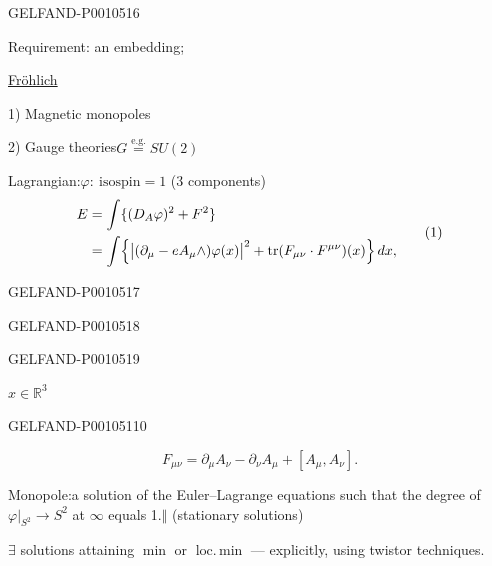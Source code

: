 \begin{GelfandAdjacentEvidence}{GELFAND-P001051}{6}


Requirement:\quad
{}
\quad an embedding;

\underline{Fröhlich}

1) Magnetic monopoles

2) Gauge theories\quad $G\overset{\text{e.g.}}{=}SU(2)$

Lagrangian:\quad $\varphi:\ \mathrm{isospin}=1$ \quad (3 components)
\begin{equation*}
\begin{aligned}
E
&=\int\{(D_A\varphi)^2+F^2\}\\
&=\int\Bigl\{
\bigl|(\partial_\mu-eA_\mu\wedge)\varphi(x)\bigr|^2
+\operatorname{tr}(F_{\mu\nu}\cdot F^{\mu\nu})(x)
\Bigr\}\,dx,
\end{aligned}
\tag{1}
\end{equation*}
\end{GelfandAdjacentEvidence}
\begin{GelfandAdjacentEvidence}{GELFAND-P001051}{7}

\end{GelfandAdjacentEvidence}
\begin{GelfandAdjacentEvidence}{GELFAND-P001051}{8}

\end{GelfandAdjacentEvidence}
\begin{GelfandAdjacentEvidence}{GELFAND-P001051}{9}


$x\in\mathbb R^3$
\end{GelfandAdjacentEvidence}
\begin{GelfandAdjacentEvidence}{GELFAND-P001051}{10}

\[
F_{\mu\nu}=\partial_\mu A_\nu-\partial_\nu A_\mu+[A_\mu,A_\nu].
\]

Monopole:\quad a solution of the Euler–Lagrange equations such that the degree of $\varphi|_{S^2}\longrightarrow S^2$
at \(\infty\) equals 1.\quad \(\Vert\) (stationary solutions)

$\exists$ solutions attaining $\min$ or $\text{loc.}\,\min$ — explicitly, using twistor techniques.
\end{GelfandAdjacentEvidence}
